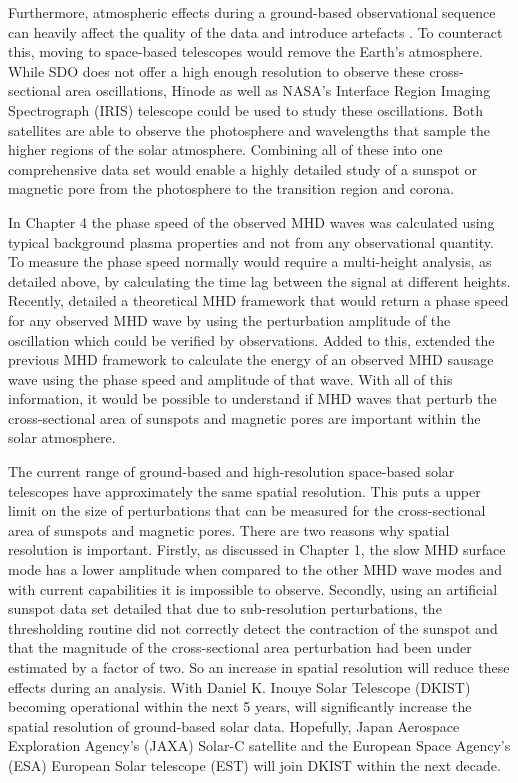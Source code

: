     Furthermore, atmospheric effects during a ground-based observational sequence can heavily affect the quality of the data and introduce artefacts \citep{2015A&A...579A..73M}.
    To counteract this, moving to space-based telescopes would remove the Earth's atmosphere.
    While SDO does not offer a high enough resolution to observe these cross-sectional area oscillations, Hinode as well as NASA's Interface Region Imaging Spectrograph (IRIS) telescope could be used to study these oscillations.
    Both satellites are able to observe the photosphere and wavelengths that sample the higher regions of the solar atmosphere. 
    Combining all of these into one comprehensive data set would enable a highly detailed study of a sunspot or magnetic pore from the photosphere to the transition region and corona.  
    
    In Chapter 4 the phase speed of the observed MHD waves was calculated using typical background plasma properties and not from any observational quantity.
    To measure the phase speed normally would require a multi-height analysis, as detailed above, by calculating the time lag between the signal at different heights.
    Recently, \cite{2015A&A...579A..73M} detailed a theoretical MHD framework that would return a phase speed for any observed MHD wave by using the perturbation amplitude of the oscillation which could be verified by observations. 
    Added to this, \cite{2015A&A...578A..60M} extended the previous MHD framework to calculate the energy of an observed MHD sausage wave using the phase speed and amplitude of that wave.
	With all of this information, it would be possible to understand if MHD waves that perturb the cross-sectional area of sunspots and magnetic pores are important within the solar atmosphere.
	
    The current range of ground-based and high-resolution space-based solar telescopes have approximately the same spatial resolution.
    This puts a upper limit on the size of perturbations that can be measured for the cross-sectional area of sunspots and magnetic pores.
    There are two reasons why spatial resolution is important.
    Firstly, as discussed in Chapter 1, the slow MHD surface mode has a lower amplitude when compared to the other MHD wave modes and with current capabilities it is impossible to observe.
    Secondly, \cite{2015A&A...579A..73M} using an artificial sunspot data set detailed that due to sub-resolution perturbations, the thresholding routine did not correctly detect the contraction of the sunspot and that the magnitude of the cross-sectional area perturbation had been under estimated by a factor of two.
    So an increase in spatial resolution will reduce these effects during an analysis.
	With Daniel K. Inouye Solar Telescope (DKIST) becoming operational within the next 5 years, will significantly increase the spatial resolution of ground-based solar data.
	Hopefully, Japan Aerospace Exploration Agency's (JAXA) Solar-C satellite and the European Space Agency's (ESA) European Solar telescope (EST) will join DKIST within the next decade.
	
